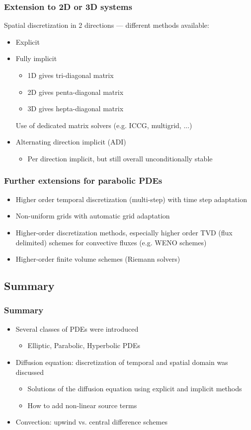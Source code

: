 \begin{frame}
  \frametitle{Extension to 2D or 3D systems}
  Spatial discretization in 2 directions --- different methods available:
  \begin{itemize}
    \item Explicit
    \item Fully implicit
    \begin{itemize}
      \item 1D gives tri-diagonal matrix
      \item 2D gives penta-diagonal matrix
      \item 3D gives hepta-diagonal matrix
    \end{itemize}
    Use of dedicated matrix solvers (e.g. ICCG, multigrid, ...)
    \item Alternating direction implicit (ADI)
    \begin{itemize}
      \item Per direction implicit, but still overall unconditionally stable
    \end{itemize}
  \end{itemize}
\end{frame}

\begin{frame}
  \frametitle{Further extensions for parabolic PDEs}
  \begin{itemize}
    \item Higher order temporal discretization (multi-step) with time step adaptation
    \item Non-uniform grids with automatic grid adaptation
    \item Higher-order discretization methods, especially higher order TVD (flux delimited) schemes for convective fluxes (e.g. WENO schemes)
    \item Higher-order finite volume schemes (Riemann solvers)  
  \end{itemize}
\end{frame}

\subsection{Summary}
\begin{frame}
  \frametitle{Summary}
  \begin{itemize}
    \item Several classes of PDEs were introduced
    \begin{itemize}
      \item Elliptic, Parabolic, Hyperbolic PDEs
    \end{itemize}
    \item Diffusion equation: discretization of temporal and spatial domain was discussed
    \begin{itemize}
      \item Solutions of the diffusion equation using explicit and implicit methods
      \item How to add non-linear source terms
    \end{itemize}
    \item Convection: upwind vs. central difference schemes
  \end{itemize}
\end{frame}